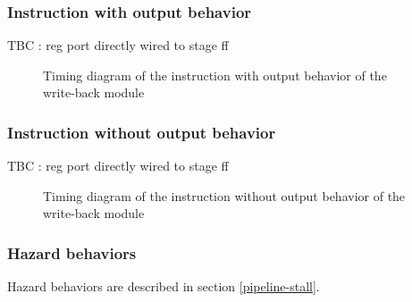     \subsubsection{Instruction with output behavior}

      \begin{content}
          TBC : reg port directly wired to stage ff
        \end{content}

      \begin{figure}[H]
          \centering
          
          \caption{Timing diagram of the instruction with output behavior of the write-back module}
          \label{fig:wbm-behavior-instruction-with-output}
        \end{figure}

    \subsubsection{Instruction without output behavior}

      \begin{content}
          TBC : reg port directly wired to stage ff
        \end{content}

      \begin{figure}[H]
          \centering
          
          \caption{Timing diagram of the instruction without output behavior of the write-back module}
          \label{fig:wbm-behavior-instruction-without-output}
        \end{figure}

    \subsubsection{Hazard behaviors}

      \begin{content}
          Hazard behaviors are described in section \ref{pipeline-stall}.
        \end{content}

\newpage
